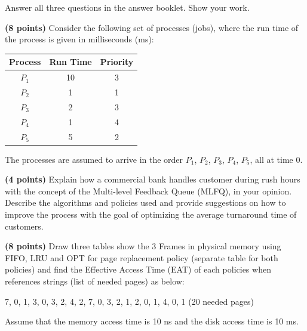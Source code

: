 \noindent Answer all three questions in the answer booklet. Show your work.\par\smallskip
\begin{questions}
\question \textbf{(8 points)} Consider the following set of processes (jobs), where the run time of the process is given in milliseconds (ms):
\begin{center}
\renewcommand{\arraystretch}{1.0}
\begin{tabular}{c|c|c}
Process & Run Time & Priority \\\hline
$P_1$ & 10 & 3 \\
$P_2$ & 1 & 1 \\
$P_3$ & 2 & 3 \\
$P_4$ & 1 & 4 \\
$P_5$ & 5 & 2
\end{tabular}
\end{center}
The processes are assumed to arrive in the order $P_1$, $P_2$, $P_3$, $P_4$, $P_5$, all at time 0.

\question \textbf{(4 points)} Explain how a commercial bank handles customer during rush hours with the concept of the Multi-level Feedback Queue (MLFQ), in your opinion. Describe the algorithms and policies used and provide suggestions on how to improve the process with the goal of optimizing the average turnaround time of customers.

\question \textbf{(8 points)} Draw three tables show the 3 Frames in physical memory using FIFO, LRU and OPT for page replacement policy (separate table for both policies) and find the Effective Access Time (EAT) of each policies when references strings (list of needed pages) as below:
\begin{center}
7, 0, 1, 3, 0, 3, 2, 4, 2, 7, 0, 3, 2, 1, 2, 0, 1, 4, 0, 1 (20 needed pages)
\end{center}
Assume that the memory access time is 10 ns and the disk access time is 10 ms.
\end{questions}
\vfill\newpage
\null\vfill\newpage
\null\vfill
